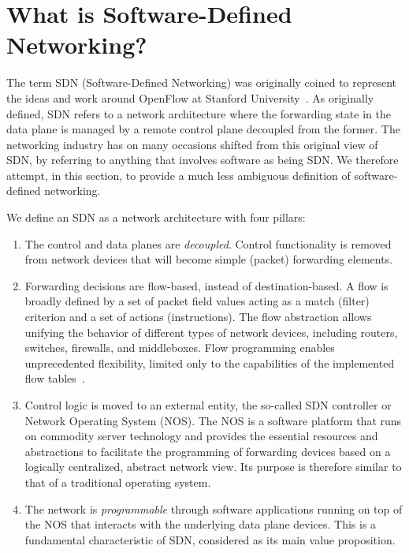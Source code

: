 \section{What is Software-Defined Networking?}

The term SDN (Software-Defined Networking)  was originally coined to represent 
the ideas and work around OpenFlow at Stanford University~\cite{greene2009}. 
As originally defined, SDN refers to a network architecture where the forwarding 
state in the data plane is managed by a remote control plane decoupled from the former.
The networking industry has on many occasions shifted from this original view of SDN, 
by referring to anything that involves software as being SDN. We therefore attempt, 
in this section, to provide a much less ambiguous definition of software-defined 
networking.

We define an SDN as a network archi\-te\-cture with four pillars:\\
\begin{enumerate}
\item  The control and data planes are \textit{decoupled}. Control functionality is 
removed from network devices that will become simple (packet) forwarding elements.
\item  Forwarding decisions are flow-based, instead of des\-ti\-na\-tion-based. A flow is 
broadly defined by a set of packet field values acting as a match (filter) criterion 
and a set of actions (instructions). The flow abstraction allows unifying the behavior of 
different types of network devices, including routers, switches, firewalls, and middleboxes. 
Flow programming enables unprecedented flexibility, limited only to the capabilities of 
the implemented flow tables~\cite{mckeown2008}.
\item Control logic is moved to an external entity, the so-called SDN controller or Network 
Operating System (NOS). The NOS is a software platform that runs on commodity server technology 
and provides the essential resources and abstractions to facilitate the programming of forwarding 
devices based on a logically centralized, abstract network view. Its purpose is therefore similar 
to that of a traditional operating system.
\item The network is \textit{programmable} through software applications running on top of the NOS that 
interacts with the underlying data plane devices. This is a fundamental characteristic of SDN, considered 
as its main value proposition.
\end{enumerate}

